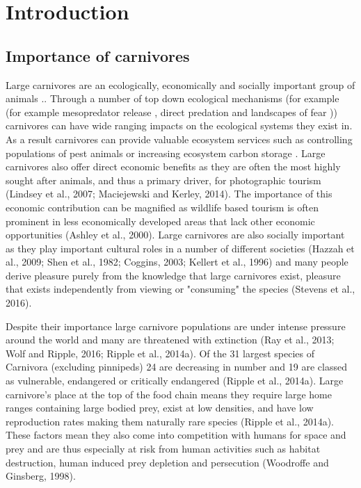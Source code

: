 \section{Introduction}

\subsection{Importance of carnivores}

Large carnivores are an ecologically, economically and socially important group of animals \cite{Wolf_2016,Ripple_2014}.\cite{Wolf_2016,Ripple_2014}. Through a number of top down ecological mechanisms (for example  (for example mesopredator release \cite{Ripple_2013,Crooks_1999}, direct predation and landscapes of fear \cite{RIPPLE_2004,Schmitz_1997})\cite{RIPPLE_2004,Schmitz_1997}) carnivores can have wide ranging impacts on the ecological systems they exist in. As a result carnivores can provide  valuable ecosystem services such as controlling populations of pest animals \cite{brashares2010ecological,Prowse_2014,Packer_2005} or increasing ecosystem carbon storage \cite{Strickland_2013}. Large carnivores also offer direct economic benefits as they are often the most highly sought after animals, and thus a primary driver, for photographic tourism (Lindsey et al., 2007; Maciejewski and Kerley, 2014). The importance of this economic contribution can be magnified as wildlife based tourism is often prominent in less economically developed areas that lack other economic opportunities (Ashley et al., 2000). Large carnivores are also socially important as they play important cultural roles in a number of different societies (Hazzah et al., 2009; Shen et al., 1982; Coggins, 2003; Kellert et al., 1996) and many people derive pleasure purely from the knowledge that large carnivores exist, pleasure that exists independently from viewing or "consuming" the species (Stevens et al., 2016).

Despite their importance large carnivore populations are under intense pressure around the world and many are threatened with extinction (Ray et al., 2013; Wolf and Ripple, 2016; Ripple et al., 2014a). Of the 31 largest species of Carnivora (excluding pinnipeds) 24 are decreasing in number and 19 are classed as vulnerable, endangered or critically endangered (Ripple et al., 2014a). Large carnivore’s place at the top of the food chain means they require large home ranges containing large bodied prey, exist at low densities, and have low reproduction rates making them naturally rare species (Ripple et al., 2014a). These factors mean they also come into competition with humans for space and prey and are thus especially at risk from human activities such as habitat destruction, human induced prey depletion and persecution (Woodroffe and Ginsberg, 1998). 


